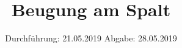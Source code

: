 

\subject{V406}
\title{Beugung am Spalt}
\date{%
  Durchführung: 21.05.2019
  \hspace{3em}
  Abgabe: 28.05.2019
}



\maketitle
\thispagestyle{empty}
\tableofcontents
\newpage






\printbibliography{}


